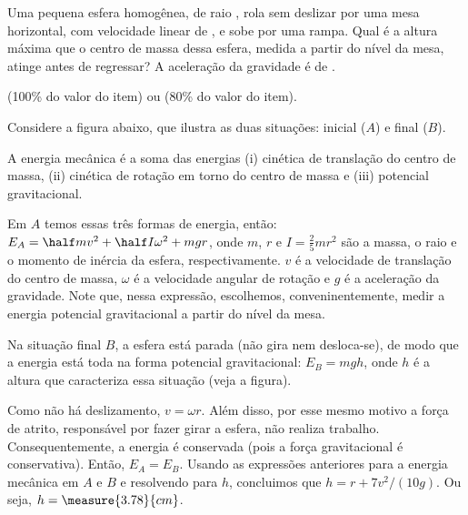 \begin{question}
    Uma pequena esfera homogênea, de raio , rola sem deslizar por uma mesa horizontal, com velocidade linear de , e sobe por uma rampa.
    Qual é a altura máxima que o centro de massa dessa esfera, medida a partir do nível da mesa, atinge antes de regressar?
    A aceleração da gravidade é de .

    \begin{answer}
       (100\% do valor do item) ou  (80\% do valor do item).
    \end{answer}
    
    \begin{solution}
      Considere a figura abaixo, que ilustra as duas situações: inicial ($A$) e final ($B$).

      
      A energia mecânica é a soma das energias (i) cinética de translação do centro de massa, (ii) cinética de rotação em torno do centro de massa e (iii) potencial gravitacional.
      
      Em $A$ temos essas três formas de energia, então: $E_A = \half m v^2 + \half I \omega^2 + mgr$, onde $m$, $r$ e $I = \frac{2}{5} mr^2$ são a massa, o raio e o momento de inércia da esfera, respectivamente.
      $v$ é a velocidade de translação do centro de massa, $\omega$ é a velocidade angular de rotação e $g$ é a aceleração da gravidade.
      Note que, nessa expressão, escolhemos, conveninentemente, medir a energia potencial gravitacional a partir do nível da mesa.

      Na situação final $B$, a esfera está parada (não gira nem desloca-se), de modo que a energia está toda na forma potencial gravitacional: $E_B = mgh$, onde $h$ é a altura que caracteriza essa situação (veja a figura).

      Como não há deslizamento, $v = \omega r$.
      Além disso, por esse mesmo motivo a força de atrito, responsável por fazer girar a esfera, não realiza trabalho.
      Consequentemente, a energia é conservada (pois a força gravitacional é conservativa).
      Então, $E_A = E_B$.
      Usando as expressões anteriores para a energia mecânica em $A$ e $B$ e resolvendo para $h$, concluimos que $h = r + 7v^2/(10g)$.
      Ou seja, $h = \measure{3.78}{cm}$.
    \end{solution}
\end{question}